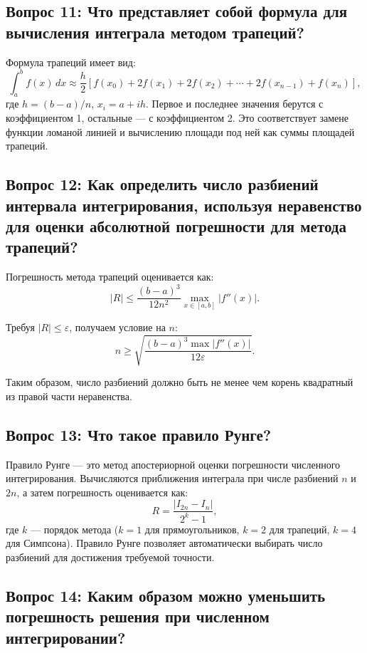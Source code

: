 \documentclass[a4paper,12pt]{article}
\begin{document}
\subsection*{Вопрос 11: Что представляет собой формула для вычисления интеграла методом трапеций?}

Формула трапеций имеет вид:
\[
\int_a^b f(x)\,dx \approx \frac{h}{2}[f(x_0) + 2f(x_1) + 2f(x_2) + \cdots + 2f(x_{n-1}) + f(x_n)],
\]
где $h = (b-a)/n$, $x_i = a + ih$. Первое и последнее значения берутся с коэффициентом 1, остальные --- с коэффициентом 2. Это соответствует замене функции ломаной линией и вычислению площади под ней как суммы площадей трапеций.

\subsection*{Вопрос 12: Как определить число разбиений интервала интегрирования, используя неравенство для оценки абсолютной погрешности для метода трапеций?}

Погрешность метода трапеций оценивается как:
\[
|R| \leq \frac{(b-a)^3}{12n^2} \max_{x \in [a,b]} |f''(x)|.
\]

Требуя $|R| \leq \varepsilon$, получаем условие на $n$:
\[
n \geq \sqrt{\frac{(b-a)^3 \max |f''(x)|}{12\varepsilon}}.
\]

Таким образом, число разбиений должно быть не менее чем корень квадратный из правой части неравенства.

\subsection*{Вопрос 13: Что такое правило Рунге?}

Правило Рунге --- это метод апостериорной оценки погрешности численного интегрирования. Вычисляются приближения интеграла при числе разбиений $n$ и $2n$, а затем погрешность оценивается как:
\[
R = \frac{|I_{2n} - I_n|}{2^k - 1},
\]
где $k$ --- порядок метода ($k=1$ для прямоугольников, $k=2$ для трапеций, $k=4$ для Симпсона). Правило Рунге позволяет автоматически выбирать число разбиений для достижения требуемой точности.

\subsection*{Вопрос 14: Каким образом можно уменьшить погрешность решения при численном интегрировании?}
\end{document}
